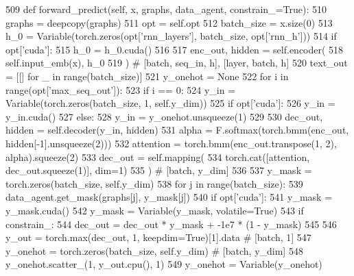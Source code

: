 \begin{DoxyCode}
509     \textcolor{keyword}{def }forward\_predict(self, x, graphs, data\_agent, constrain\_=True):
510         graphs = deepcopy(graphs)
511         opt = self.opt
512         batch\_size = x.size(0)
513         h\_0 = Variable(torch.zeros(opt[\textcolor{stringliteral}{'rnn\_layers'}], batch\_size, opt[\textcolor{stringliteral}{'rnn\_h'}]))
514         \textcolor{keywordflow}{if} opt[\textcolor{stringliteral}{'cuda'}]:
515             h\_0 = h\_0.cuda()
516 
517         enc\_out, hidden = self.encoder(
518             self.input\_emb(x), h\_0
519         )  \textcolor{comment}{# [batch, seq\_in, h], [layer, batch, h]}
520         text\_out = [[] \textcolor{keywordflow}{for} \_ \textcolor{keywordflow}{in} range(batch\_size)]
521         y\_onehot = \textcolor{keywordtype}{None}
522         \textcolor{keywordflow}{for} i \textcolor{keywordflow}{in} range(opt[\textcolor{stringliteral}{'max\_seq\_out'}]):
523             \textcolor{keywordflow}{if} i == 0:
524                 y\_in = Variable(torch.zeros(batch\_size, 1, self.y\_dim))
525                 \textcolor{keywordflow}{if} opt[\textcolor{stringliteral}{'cuda'}]:
526                     y\_in = y\_in.cuda()
527             \textcolor{keywordflow}{else}:
528                 y\_in = y\_onehot.unsqueeze(1)
529 
530             dec\_out, hidden = self.decoder(y\_in, hidden)
531             alpha = F.softmax(torch.bmm(enc\_out, hidden[-1].unsqueeze(2)))
532             attention = torch.bmm(enc\_out.transpose(1, 2), alpha).squeeze(2)
533             dec\_out = self.mapping(
534                 torch.cat([attention, dec\_out.squeeze(1)], dim=1)
535             )  \textcolor{comment}{# [batch, y\_dim]}
536 
537             y\_mask = torch.zeros(batch\_size, self.y\_dim)
538             \textcolor{keywordflow}{for} j \textcolor{keywordflow}{in} range(batch\_size):
539                 data\_agent.get\_mask(graphs[j], y\_mask[j])
540             \textcolor{keywordflow}{if} opt[\textcolor{stringliteral}{'cuda'}]:
541                 y\_mask = y\_mask.cuda()
542             y\_mask = Variable(y\_mask, volatile=\textcolor{keyword}{True})
543             \textcolor{keywordflow}{if} constrain\_:
544                 dec\_out = dec\_out * y\_mask + -1e7 * (1 - y\_mask)
545 
546             y\_out = torch.max(dec\_out, 1, keepdim=\textcolor{keyword}{True})[1].data  \textcolor{comment}{# [batch, 1]}
547             y\_onehot = torch.zeros(batch\_size, self.y\_dim)  \textcolor{comment}{# [batch, y\_dim]}
548             y\_onehot.scatter\_(1, y\_out.cpu(), 1)
549             y\_onehot = Variable(y\_onehot)

\end{DoxyCode}
